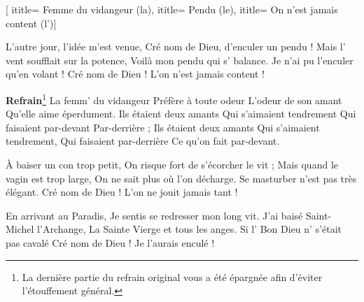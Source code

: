  [
ititle= {Femme du vidangeur (la)},
ititle= {Pendu (le)},
ititle= {On n'est jamais content (l')}]


\beginverse
L'autre jour, l'idée m'est venue,
Cré nom de Dieu, d'enculer un pendu !
Mais l' vent soufflait sur la potence,
Voilà mon pendu qui s' balance.
Je n'ai pu l'enculer qu'en volant !
Cré nom de Dieu ! L'on n'est jamais content !
\endverse

\beginchorus
\textbf {Refrain}\footnote {La dernière partie du refrain original vous a été épargnée afin d'éviter l'étouffement général.}
La femm' du vidangeur
Préfère à toute odeur
L'odeur de son amant
Qu'elle aime éperdument.
Ils étaient deux amants
Qui s'aimaient tendrement
Qui faisaient par-devant
Par-derrière ;
Ils étaient deux amants
Qui s'aimaient tendrement,
Qui faisaient par-derrière
Ce qu'on fait par-devant.
\endchorus

\beginverse
À baiser un con trop petit,
On risque fort de s'écorcher le vit ;
Mais quand le vagin est trop large,
On ne sait plus où l'on décharge.
Se masturber n'est pas très élégant.
Cré nom de Dieu ! L'on ne jouit jamais tant !
\endverse

\beginverse
En arrivant au Paradis,
Je sentis se redresser mon long vit.
J'ai baisé Saint-Michel l'Archange,
La Sainte Vierge et tous les anges.
Si l' Bon Dieu n' s'était pas cavalé
Cré nom de Dieu ! Je l'aurais enculé !
\endverse

\endsong